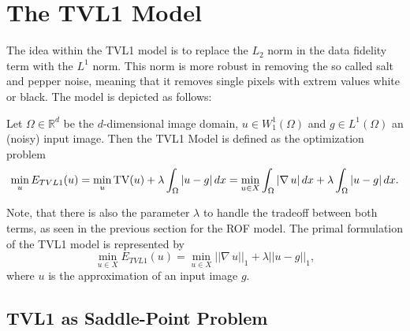 \section{The TVL1 Model} %
\label{sec:the_tvl1_model}
    
    The idea within the TVL1 model is to replace the $L_{2}$ norm in the data fidelity term with the $L^{1}$ norm. This norm is more robust in removing the so called salt and pepper noise, meaning that it removes single pixels with extrem values white or black. The model is depicted as follows:

    \begin{definition} %
    \label{def:the_tvl1_model}

        Let $\Omega \in \mathbb{R}^{d}$ be the $d$-dimensional image domain, $u \in W_{1}^{1}(\Omega)$ and $g \in L^{1}(\Omega)$ an (noisy) input image. Then the TVL1 Model is defined as the optimization problem
            \begin{equation}
                \min_{u} E_{TVL1}(u) = \min_{u} \textnormal{TV}(u) + \lambda \int_{\Omega} |u - g| \, dx = \min_{u \in X} \int_{\Omega} |\nabla \, u| \, dx + \lambda \int_{\Omega} |u - g| \, dx.
                \label{eq:the_tvl1_model}
            \end{equation}

    \end{definition}

    Note, that there is also the parameter $\lambda$ to handle the tradeoff between both terms, as seen in the previous section for the ROF model. The primal formulation of the TVL1 model is represented by
        \begin{equation}
            \min_{u \in X} E_{TVL1}(u) = \min_{u \in X} ||\nabla \, u||_{1} + \lambda ||u - g||_{1},
        \label{eq:primal_tvl1_problem}
        \end{equation}
    where $u$ is the approximation of an input image $g$.

    \subsection{TVL1 as Saddle-Point Problem} %
    \label{sub:tvl1_as_saddle_point_problem}

